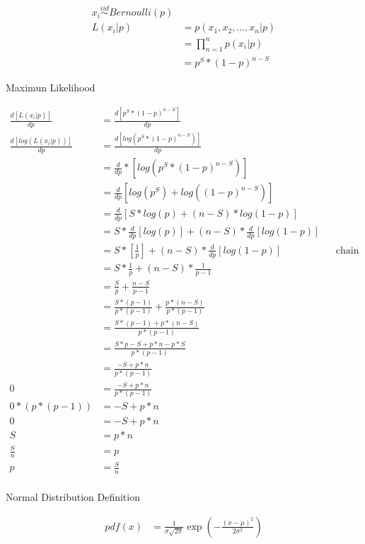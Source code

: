 \documentclass[]{article}
\begin{document}
\begin{align}
	x_i \overset{iid}{\sim} Bernoulli(p)\\
	L(x_i|p)&=p(x_1,x_2,...,x_n|p)\\&=\prod_{n=1}^np(x_i|p)\\
	&=p^S*(1-p)^{n-S}
 \end{align}
 
 Maximun Likelihood
 
 \begin{align}
	 \frac{d[L(x_i|p)]}{dp} &=\frac{d[p^S*(1-p)^{n-S}]}{dp}\\
	 \frac{d[log(L(x_i|p))]}{dp} &=\frac{d[log(p^S*(1-p)^{n-S})]}{dp}\\
	 &= \frac{d}{dp}*[log(p^S*(1-p)^{n-S})]\\
	 &= \frac{d}{dp}[log(p^S)+log((1-p)^{n-S})]\\
	 &= \frac{d}{dp}[S*log(p)+(n-S)*log(1-p)]\\
	 &= S*\frac{d}{dp}[log(p)]+(n-S)*\frac{d}{dp}[log(1-p)]\\
	 &= S*[\frac{1}{p}]+(n-S)*\frac{d}{dp}[log(1-p)] && \text{chain rule}\\
	 &= S*\frac{1}{p}+(n-S)*\frac{1}{p-1}\\
 	 &= \frac{S}{p}+\frac{n-S}{p-1}\\
 	 &= \frac{S*(p-1)}{p*(p-1)}+\frac{p*(n-S)}{p*(p-1)}\\
 	 &= \frac{S*(p-1)+p*(n-S)}{p*(p-1)}\\
 	 &= \frac{S*p-S+p*n-p*S}{p*(p-1)}\\
 	 &= \frac{-S+p*n}{p*(p-1)}\\
 	 0 &= \frac{-S+p*n}{p*(p-1)}\\
  	 0*(p*(p-1)) &= -S+p*n\\
  	 0 &= -S+p*n\\
 	 S &= p*n\\
 	 \frac{S}{n} &= p\\
  	 p &= \frac{S}{n}\\
 \end{align}

Normal Distribution
Definition

\begin{align}
pdf(x) &= \frac{1}{\sigma\sqrt{2\pi}}\exp\left(-\frac{(x-\mu)^2}{2\sigma^2}\right)
\end{align}
\end{document}
